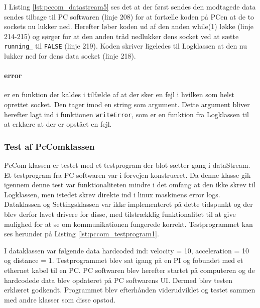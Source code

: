 

I Listing \ref{lst:pccom_datastream5} ses det at der først sendes den modtagede data sendes tilbage til PC softwaren (linje 208) for at fortælle koden på PCen at de to sockets nu lukker ned. Herefter løber koden ud af den anden while(1) løkke (linje 214-215) og sørger for at den anden tråd nedlukker dens socket ved at sætte \texttt{running\_} til \texttt{FALSE} (linje 219). Koden skriver ligeledes til Logklassen at den nu lukker ned for dens data socket (linje 218).

\clearpage

\paragraph{error} er en funktion der kaldes i tilfælde af at der sker en fejl i hvilken som helst oprettet socket. Den tager imod en string som argument. Dette argument bliver herefter lagt ind i funktionen \texttt{writeError}, som er en funktion fra Logklassen til at erklære at der er opstået en fejl.



\subsubsection{Test af PcComklassen}
PcCom klassen er testet med et testprogram der blot sætter gang i dataStream. Et testprogram fra PC softwaren var i forvejen konstrueret. Da denne klasse gik igennem denne test var funktionaliteten mindre i det omfang at den ikke skrev til Logklassen, men istedet skrev direkte ind i linux maskinens error logs. Dataklassen og Settingsklassen var ikke implementeret på dette tidspunkt og der blev derfor lavet drivere for disse, med tilstrækklig funktionalitet til at give mulighed for at se om kommunikationen fungerede korrekt. Testprogrammet kan ses herunder på Listing \ref{lst:pccom_testprogram1}.



I dataklassen var følgende data hardcoded ind: velocity = 10, acceleration = 10 og distance = 1. Testprogrammet blev sat igang på en PI og fobundet med et ethernet kabel til en PC. PC softwaren blev herefter startet på computeren og de hardcodede data blev opdateret på PC softwarens UI. Dermed blev testen erklæret godkendt. Programmet blev efterhånden viderudviklet og testet sammen med andre klasser som disse opstod.